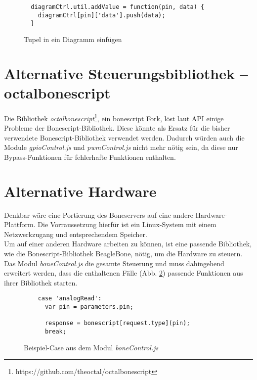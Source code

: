 \begin{figure}[H]
  \begin{lstlisting}
  diagramCtrl.util.addValue = function(pin, data) {
    diagramCtrl[pin]['data'].push(data);
  }
  \end{lstlisting}
  \caption{Tupel in ein Diagramm einfügen}
  \label{lst:insertTupel}
\end{figure}


\section{Alternative Steuerungsbibliothek -- octalbonescript}
Die Bibliothek \textit{octalbonescript}\footnote{https://github.com/theoctal/octalbonescript}, ein bonescript Fork, löst laut API einige Probleme der Bonescript-Bibliothek. Diese könnte als Ersatz für die bisher verwendete Bonescript-Bibliothek verwendet werden. Dadurch würden auch die Module \textit{gpioControl.js} und \textit{pwmControl.js} nicht mehr nötig sein, da diese nur Bypass-Funktionen für fehlerhafte Funktionen enthalten.


\section{Alternative Hardware}
Denkbar wäre eine Portierung des Boneservers auf eine andere Hardware-Plattform. Die Vorraussetzung hierfür ist ein Linux-System mit einem Netzwerkzugang und entsprechendem Speicher.\\

Um auf einer anderen Hardware arbeiten zu können, ist eine passende Bibliothek, wie die Bonescript-Bibliothek BeagleBone, nötig, um die Hardware zu steuern. Das Modul \textit{boneControl.js} die gesamte Steuerung und muss dahingehend erweitert werden, dass die enthaltenen Fälle (Abb. \ref{lst:exampleCase}) passende Funktionen aus ihrer Bibliothek starten.

\begin{figure}[H]
  \begin{lstlisting}
    case 'analogRead':
      var pin = parameters.pin;

      response = bonescript[request.type](pin);
      break;
  \end{lstlisting}
  \caption{Beispiel-Case aus dem Modul \textit{boneControl.js}}
  \label{lst:exampleCase}
\end{figure}


